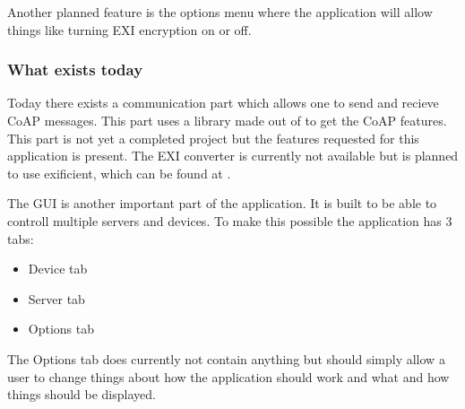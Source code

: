 Another planned feature is the options menu where the application will allow things like turning EXI encryption on or off. 

\subsubsection{What exists today}

Today there exists a communication part which allows one to send and recieve CoAP messages. This part uses a library made out of %
to get the CoAP features. This part is not yet a completed project but the features requested for this application is present. The EXI converter is currently not available but is planned to use exificient, 
which can be found at .

The GUI is another important part of the application. It is built to be able to controll multiple servers and devices. 
To make this possible the application has 3 tabs:	%
\begin{itemize}
 \item Device tab
 \item Server tab
 \item Options tab
\end{itemize}

The Options tab does currently not contain anything but should simply allow a user to change things about how the application should work and what and how things should be displayed. 

